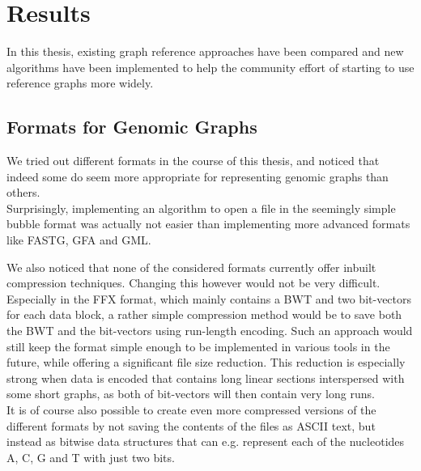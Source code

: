 \documentclass[a4paper,12pt,twoside,BCOR=10mm]{scrbook}
\begin{document}
\chapter{Results}
%

In this thesis, existing graph reference approaches have been compared 
and new algorithms have been implemented to help the community effort 
of starting to use reference graphs more widely.

\section{Formats for Genomic Graphs}
\label{sec:results_data_formats}
%

We tried out different formats in the course of this thesis, 
and noticed that indeed some do seem more appropriate for representing genomic graphs than others. \\
Surprisingly, implementing an algorithm to open a file in the seemingly simple bubble format was actually 
not easier than implementing more advanced formats like FASTG, GFA and GML.

We also noticed that none of the considered formats currently offer inbuilt compression techniques. 
Changing this however would not be very difficult. Especially in the FFX format, 
which mainly contains a BWT and two bit-vectors for each data block, 
a rather simple compression method would be to save both the BWT and the bit-vectors 
using run-length encoding. 
Such an approach would still keep the format simple enough to be implemented in various 
tools in the future, while offering a significant file size reduction. 
This reduction is especially strong when data is encoded that contains long linear sections 
interspersed with some short graphs, as both of bit-vectors will then 
contain very long runs. \\
It is of course also possible to create even more compressed versions 
of the different formats by not saving the contents of the files as ASCII text, 
but instead as bitwise data structures that can e.g. represent each of the nucleotides A, C, G and T with 
just two bits.
\end{document}
